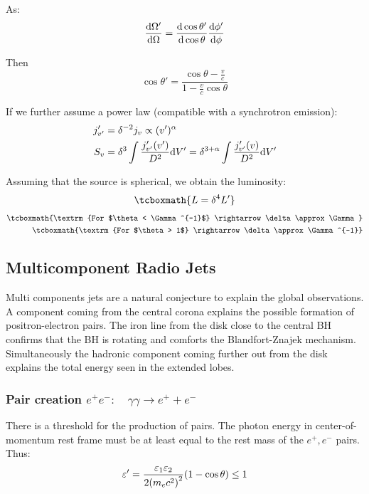 \documentclass[10pt,a4paper,english]{article}
\let\originalleft\left
\let\originalright\right
\renewcommand{\left}{\mathopen{}\mathclose\bgroup\originalleft}
\renewcommand{\right}{\aftergroup\egroup\originalright}
\begin{document}
As:
\begin{equation}
    \frac{\mathrm{d}\Omega'}{\mathrm{d}\Omega} = \frac{\mathrm{d}\cos{\theta'}}{\mathrm{d}\cos{\theta}}\frac{\mathrm{d}\phi'}{\mathrm{d}\phi}
\end{equation}

Then
\begin{equation}
    \cos{\theta'} = \frac{\cos{\theta} - \frac{v}{c}}{1 - \frac{v}{c}\cos{\theta}}
\end{equation}

If we further assume a power law (compatible with a synchrotron emission):
\begin{align}
    j_{v'}' &= \delta^{-2} j_v \propto (v')^\alpha \\
    S_v    &= \delta^3 \int \frac{j_{v'}' (v')}{D^2} \mathrm{d} V' = \delta^{3+\alpha}\int \frac{j_{v'}' (v)}{D^2}\mathrm{d} V'
\end{align}

Assuming that the source is spherical, we obtain the luminosity:
\begin{equation}
    \tcboxmath{
        L = \delta^4 L'
    }
\end{equation}
\begin{align}
    \tcboxmath{\textrm{For $\theta < \Gamma^{-1}$} \rightarrow \delta\approx\Gamma} \\
    \tcboxmath{\textrm{For $\theta > 1$} \rightarrow \delta\approx\Gamma^{-1}}
\end{align}

\subsection{Multicomponent Radio Jets}

Multi components jets are a natural conjecture to explain the global
observations. A component coming from the central corona explains the possible
formation of positron-electron pairs. The iron  line from the disk close
to the central BH confirms that the BH is rotating and comforts the
Blandfort-Znajek mechanism. Simultaneously the hadronic component coming
further out from the disk explains the total energy seen in the extended lobes.

\subsubsection{\texorpdfstring{Pair creation $e^+ e^-: \quad \gamma\gamma \rightarrow e^+ + e^-$}{Pair creation e⁺e⁻: γγ → e⁺ + e⁻}}

There is a threshold for the production of pairs. The photon energy in
center-of-momentum rest frame must be at least equal to the rest mass of the
$e^+,e^-$ pairs. Thus:
\begin{equation}
    \varepsilon' = \frac{\varepsilon_1\varepsilon_2}{2 \left( m_ec^2 \right)^2}\left( 1-\cos\theta \right) \leq 1
\end{equation}
\end{document}
